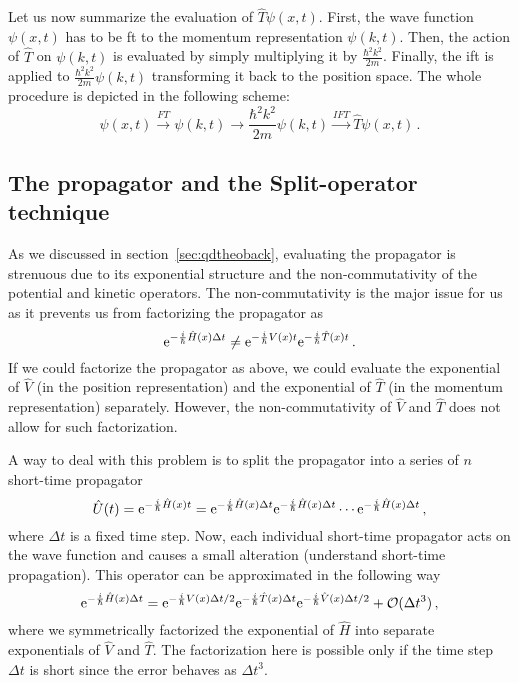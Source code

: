 Let us now summarize the evaluation of $\hat{T}\psi(x,t)$. First, the wave function $\psi(x,t)$ has to be \acrshort{ft} to the momentum representation $\psi(k,t)$. Then, the action of $\hat{T}$ on $\psi(k,t)$ is evaluated by simply multiplying it by $\frac{\hbar^2 k^2}{2m}$. Finally, the \acrshort{ift} is applied to $\frac{\hbar^2 k^2}{2m} \psi(k,t)$ transforming it back to the position space. The whole procedure is depicted in the following scheme:
\begin{equation}
    \psi(x,t) \stackrel{FT}{\longrightarrow} \psi(k,t) \longrightarrow \frac{\hbar^2 k^2}{2m} \psi(k,t) \stackrel{IFT}{\longrightarrow} \hat{T}\psi(x,t) \, .
\end{equation}

\subsection{The propagator and the Split-operator technique}

As we discussed in section~\ref{sec:qdtheoback}, evaluating the propagator is strenuous due to its exponential structure and the non-commutativity of the potential and kinetic operators. The non-commutativity is the major issue for us as it prevents us from factorizing the propagator as
\begin{equation}
    \mathrm{e}^{-\frac{i}{\hbar}\hat{H}(x)\Delta t} \neq \mathrm{e}^{-\frac{i}{\hbar}V(x)t}\mathrm{e}^{-\frac{i}{\hbar}\hat{T}(x)t}\, .
\end{equation}
If we could factorize the propagator as above, we could evaluate the exponential of $\hat{V}$ (in the position representation) and the exponential of $\hat{T}$ (in the momentum representation) separately. However, the non-commutativity of $\hat{V}$ and $\hat{T}$ does not allow for such factorization.

A way to deal with this problem is to split the propagator into a series of $n$ short-time propagator
\begin{equation}
    \hat{U}(t) = \mathrm{e}^{-\frac{i}{\hbar}\hat{H}(x)t} = \mathrm{e}^{-\frac{i}{\hbar}\hat{H}(x)\Delta t} \mathrm{e}^{-\frac{i}{\hbar}\hat{H}(x)\Delta t} \cdots \mathrm{e}^{-\frac{i}{\hbar}\hat{H}(x)\Delta t} \, ,
    \label{eq:U4}
\end{equation}
where $\Delta t$ is a fixed time step. Now, each individual short-time propagator acts on the wave function and causes a small alteration (understand short-time propagation). This operator can be approximated in the following way
\begin{equation}
    \mathrm{e}^{-\frac{i}{\hbar}\hat{H}(x)\Delta t} = \mathrm{e}^{-\frac{i}{\hbar}V(x)\Delta t/2}\mathrm{e}^{-\frac{i}{\hbar}\hat{T}(x)\Delta t}\mathrm{e}^{-\frac{i}{\hbar}\hat{V}(x)\Delta t/2} + \mathcal{O}(\Delta t^3) \, ,
\end{equation}
where we symmetrically factorized the exponential of $\hat{H}$ into separate exponentials of $\hat{V}$ and $\hat{T}$. The factorization here is possible only if the time step $\Delta t$ is short since the error behaves as $\Delta t^3$. 

